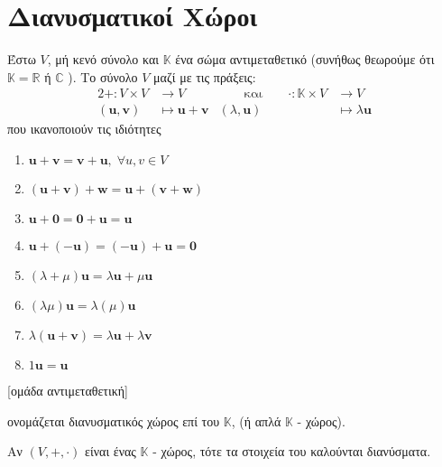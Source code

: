 



\let\oldhat\hat
\renewcommand{\vec}[1]{\mathbf{#1}}
\renewcommand{\hat}[1]{\oldhat{\mathbf{#1}}} 




\chapter{Διανυσματικοί Χώροι}


\begin{dfn}
\item {}
	Έστω $V$, μή κενό σύνολο και $\mathbb{K}$ ένα σώμα αντιμεταθετικό 
    (συνήθως θεωρούμε ότι $ \mathbb{K} = \mathbb{R} $ ή $\mathbb{C}$ ). 
    Το σύνολο $V$ μαζί με τις πράξεις:
	\begin{alignat*}{2}
        + \colon V \times V &\to V & \qquad \text{και} \qquad \cdot \colon \mathbb{K} 
        \times V &\to V \\ ( \vec{u}, \vec{v} ) &\mapsto \vec{u} + \vec{v} 
                 & ( \lambda, \vec{u} ) &\mapsto \lambda \vec{u} 
	\end{alignat*}
    \vspace{\baselineskip}
που ικανοποιούν τις ιδιότητες 

    \begin{minipage}{0.3\textwidth}
\begin{enumerate}
    \item $ \vec{u} + \vec{v} = \vec{v} + \vec{u}, \; \forall u,v \in V $ 
        \hfill{}
	\item $ ( \vec{u} + \vec{v} ) + \vec{w} = \vec{u} + ( \vec{v} + \vec{w}) $ 
	\item $ \vec{u} + \vec{0} = \vec{0} + \vec{u} = \vec{u} $ 
	\item $ \vec{u} + ( - \vec{u} ) = ( - \vec{u} ) + \vec{u} = \vec{0} $ \hfill{}
	\item $ ( \lambda + \mu ) \vec{u} = \lambda \vec{u} + \mu \vec{u} $ 
	\item $ ( \lambda \mu ) \vec{u} = \lambda ( \mu) \vec{u} $ 
	\item $ \lambda ( \vec{u} + \vec{v} ) = \lambda \vec{u} + \lambda \vec{v} $ 
	\item $ 1 \vec{u} = \vec{u} $ 
\end{enumerate}
[ομάδα αντιμεταθετική]
\end{minipage}

ονομάζεται διανυσματικός χώρος επί του $\mathbb{K}$, (ή απλά $ \mathbb{K} $ - χώρος).
\end{dfn}

\begin{dfn}
Αν $ (V,+,\cdot) $ είναι ένας $ \mathbb{K} $ - χώρος, τότε τα στοιχεία του καλούνται 
διανύσματα.
\end{dfn}




